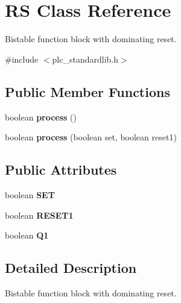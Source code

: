 \hypertarget{class_r_s}{\section{R\+S Class Reference}
\label{class_r_s}
}


Bistable function block with dominating reset.  




{\ttfamily \#include $<$plc\+\_\+standardlib.\+h$>$}

\subsection*{Public Member Functions}
\begin{DoxyCompactItemize}
\item 
\hypertarget{class_r_s_a4b121f8ab2e5f6f589b2645365e80d83}{boolean {\bfseries process} ()}\label{class_r_s_a4b121f8ab2e5f6f589b2645365e80d83}

\item 
\hypertarget{class_r_s_aa1ef0f2b384b32f3322379c59b1048a5}{boolean {\bfseries process} (boolean set, boolean reset1)}\label{class_r_s_aa1ef0f2b384b32f3322379c59b1048a5}

\end{DoxyCompactItemize}
\subsection*{Public Attributes}
\begin{DoxyCompactItemize}
\item 
\hypertarget{class_r_s_a52af8e9a9f22c4e23cdca7b322056332}{boolean {\bfseries S\+E\+T}}\label{class_r_s_a52af8e9a9f22c4e23cdca7b322056332}

\item 
\hypertarget{class_r_s_aa08f39673c7cbd0f24d99e32e8d9a7dd}{boolean {\bfseries R\+E\+S\+E\+T1}}\label{class_r_s_aa08f39673c7cbd0f24d99e32e8d9a7dd}

\item 
\hypertarget{class_r_s_ad75a62944c373fb5e6dd7a7996c5af71}{boolean {\bfseries Q1}}\label{class_r_s_ad75a62944c373fb5e6dd7a7996c5af71}

\end{DoxyCompactItemize}


\subsection{Detailed Description}
Bistable function block with dominating reset. 

